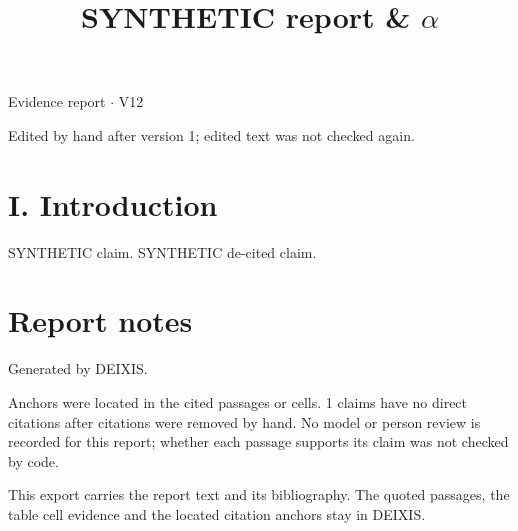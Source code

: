 \documentclass[journal]{IEEEtran}
\begin{document}
\title{SYNTHETIC report \& \ensuremath{\alpha}}

\maketitle

\noindent Evidence report \ensuremath{\cdot} V12

\noindent Edited by hand after version 1; edited text was not checked again.

\section*{I. Introduction}

SYNTHETIC claim. \cite{Synth26} SYNTHETIC de-cited claim.

\section*{Report notes}

Generated by DEIXIS.

Anchors were located in the cited passages or cells. 1 claims have no direct citations after citations were removed by hand. No model or person review is recorded for this report; whether each passage supports its claim was not checked by code.

This export carries the report text and its bibliography. The quoted passages, the table cell evidence and the located citation anchors stay in DEIXIS.




\end{document}

